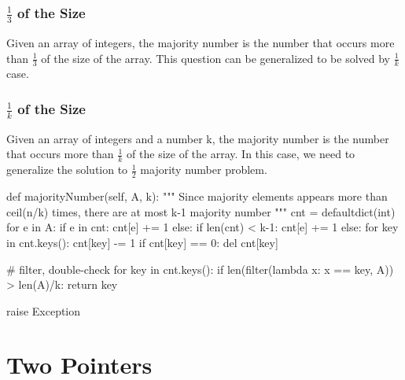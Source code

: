\subsubsection{$\frac{1}{3}$ of the Size}
Given an array of integers, the majority number is the number that occurs more than $\frac{1}{3}$ of the size of the array. This question can be generalized to be solved by $\frac{1}{k}$ case. 

\subsubsection{$\frac{1}{k}$ of the Size}
Given an array of integers and a number k, the majority number is the number that occurs more than $\frac{1}{k}$ of the size of the array. In this case, we need to generalize the solution to $\frac{1}{2}$ majority number problem.

\begin{python}

def majorityNumber(self, A, k):
    """
    Since majority elements appears more 
    than ceil(n/k) times, there are at 
    most k-1 majority number
    """
    cnt = defaultdict(int)
    for e in A:
        if e in cnt:
            cnt[e] += 1
        else:
            if len(cnt) < k-1:
                cnt[e] += 1
            else:
                for key in cnt.keys():
                    cnt[key] -= 1
                    if cnt[key] == 0:
                        del cnt[key]
    
    
    # filter, double-check
    for key in cnt.keys():
        if len(filter(lambda x: x == key, A)) 
            > len(A)/k:
            return key

    raise Exception
\end{python}


\section{Two Pointers}
